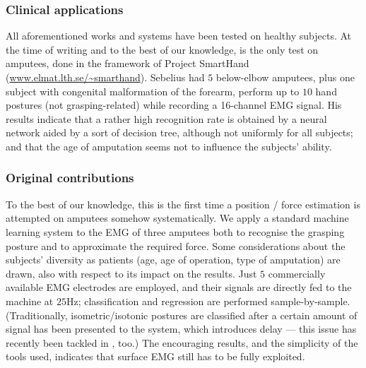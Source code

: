 \subsubsection{Clinical applications}

All aforementioned works and systems have been tested on healthy subjects. At the time
of writing and to the best of our knowledge, \cite{sebelius} is the only test on amputees, done
in the framework of Project SmartHand (\url{www.elmat.lth.se/~smarthand}).
Sebelius had $5$ below-elbow amputees, plus one subject
with congenital malformation of the forearm, perform up to
$10$ hand postures (not grasping-related) while recording a 16-channel EMG signal. His
results indicate that a rather high recognition rate is obtained by a neural network
aided by a sort of decision tree, although not uniformly for all subjects; and that
the age of amputation seems not to influence the subjects' ability.

\subsubsection{Original contributions}

To the best of our knowledge, this is the first time a position / force estimation
is attempted on amputees somehow systematically. We apply a standard machine learning
system to the EMG of three amputees both to recognise the grasping posture and
to approximate the required force. Some considerations about the subjects' diversity
as patients (age, age of operation, type of amputation) are drawn, also with respect to
its impact on the results. Just $5$ commercially available EMG electrodes are
employed, and their signals are directly fed to the machine at $25$Hz;
classification and regression are performed sample-by-sample.
(Traditionally, isometric/isotonic postures are classified after a certain amount
of signal has been presented to the system, which introduces delay --- this issue
has recently been tackled in \cite{tsukamoto}, too.) The encouraging results,
and the simplicity of the tools used, indicates that surface EMG still has to be
fully exploited.

